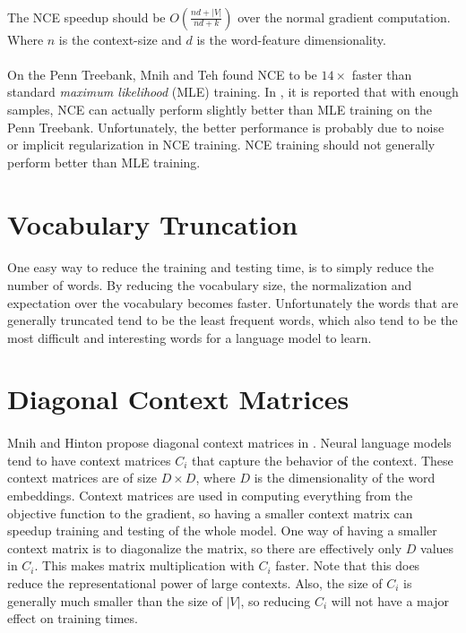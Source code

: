 \paragraph{}
The NCE speedup should be $O \left(\frac{nd + |V|} {nd+ k} \right)$ over the normal gradient computation. Where $n$ is the context-size and $d$ is the word-feature dimensionality.
\paragraph{}
On the Penn Treebank, Mnih and Teh found NCE to be $14\times$ faster than standard \emph{maximum likelihood} (MLE)  training. In \cite{MnihTeh2012}, it is reported that with enough samples, NCE can actually perform slightly better than MLE training on the Penn Treebank. Unfortunately, the better performance is probably due to noise or implicit regularization in NCE training. NCE training should not generally perform better than MLE training.


\section{Vocabulary Truncation}
\paragraph{}
One easy way to reduce the training and testing time, is to simply reduce the number of words. By reducing the vocabulary size, the normalization and expectation over the vocabulary becomes faster. Unfortunately the words that are generally truncated tend to be the least frequent words, which also tend to be the most difficult and interesting words for a language model to learn. 
\section{Diagonal Context Matrices}
\paragraph{}
Mnih and Hinton propose diagonal context matrices in \cite{MnihHinton2009}. Neural language models tend to have context matrices $C_i$ that capture the behavior of the context. These context matrices are of size $D \times D$, where $D$ is the dimensionality of the word embeddings. Context matrices are used in computing everything from the objective function to the gradient, so having a smaller context matrix can speedup training and testing of the whole model. One way of having a smaller context matrix is to diagonalize the matrix, so there are effectively only $D$ values in $C_i$. This makes matrix multiplication with $C_i$ faster. Note that this does reduce the representational power of large contexts. Also, the size of $C_i$ is generally much smaller than the size of $|V|$, so reducing $C_i$ will not have a major effect on training times.


